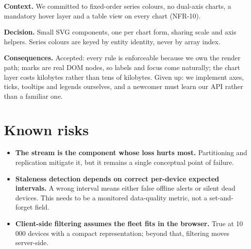 \documentclass[11pt,a4paper]{article}
\begin{document}
\textbf{Context.} We committed to fixed-order series colours, no dual-axis charts, a
mandatory hover layer and a table view on every chart (NFR-10).

\textbf{Decision.} Small SVG components, one per chart form, sharing scale and axis
helpers. Series colours are keyed by entity identity, never by array index.

\textbf{Consequences.} Accepted: every rule is enforceable because we own the render
path; marks are real DOM nodes, so labels and focus come naturally; the chart layer
costs kilobytes rather than tens of kilobytes. Given up: we implement axes, ticks,
tooltips and legends ourselves, and a newcomer must learn our API rather than a
familiar one.

\section{Known risks}

\begin{itemize}
  \item \textbf{The stream is the component whose loss hurts most.} Partitioning and
        replication mitigate it, but it remains a single conceptual point of failure.
  \item \textbf{Staleness detection depends on correct per-device expected
        intervals.} A wrong interval means either false offline alerts or silent dead
        devices. This needs to be a monitored data-quality metric, not a
        set-and-forget field.
  \item \textbf{Client-side filtering assumes the fleet fits in the browser.} True at
        10\,000 devices with a compact representation; beyond that, filtering moves
        server-side.
\end{itemize}
\end{document}
